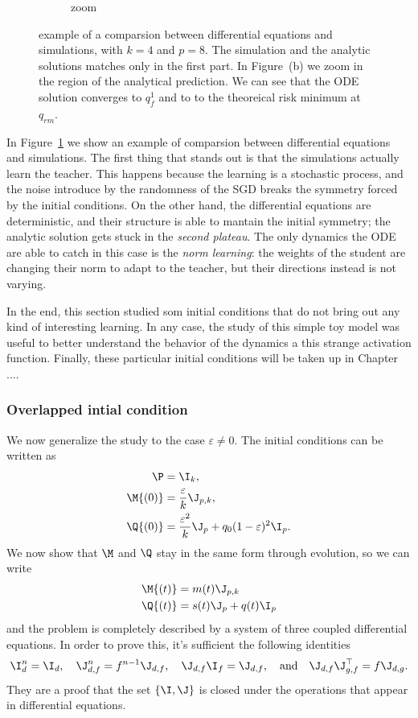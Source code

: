 \begin{figure}
\begin{subfigure}{0.45\textwidth}
    \caption{zoom}
  \end{subfigure}
  \caption{
    example of a comparsion between differential equations and simulations, with \(k=4\) and \(p=8\).
    The simulation and the analytic solutions matches only in the first part.
    In Figure~(b) we zoom in the region of the analytical prediction. We can see
    that the ODE solution converges to \(q_f^1\) and to to the theoreical risk minimum at \(q_{rm}\).
  }
  \label{fig:example-eps0}
\end{figure}
In Figure~\ref{fig:example-eps0} we show an example of comparsion between differential equations and simulations.
The first thing that stands out is that the simulations actually learn the teacher.
This happens because the learning is a stochastic process, and the noise introduce
by the randomness of the SGD breaks the symmetry forced by the initial conditions.
On the other hand, the differential equations are deterministic, and their structure
is able to mantain the initial symmetry; the analytic solution gets stuck in the 
\emph{second plateau}. The only dynamics the ODE are able to catch in this case is 
the \emph{norm learning}: the weights of the student are changing their norm to adapt 
to the teacher, but their directions instead is not varying.

In the end, this section studied som initial conditions that do not bring out any kind of interesting learning.
In any case, the study of this simple toy model was useful to better understand the behavior of the dynamics a this strange activation function.
Finally, these particular initial conditions will be taken up in Chapter ....

\subsubsection{Overlapped intial condition}
We now generalize the study to the case \(\varepsilon\neq0\).
The initial conditions can be written as
\[\begin{split}
    \P &= \I_k,\\
    \M{(0)} &= \frac{\varepsilon}{k}\J_{p,k},\\
    \Q{(0)} &= \frac{\varepsilon^2}{k}\J_{p} + q_0(1-\varepsilon)^2\I_{p}.\\
\end{split}\]
We now show that \(\M\) and \(\Q\) stay in the same form through evolution, so we can write
\[\begin{split}
    \M{(t)} &= m{(t)} \J_{p,k} \\
    \Q{(t)} &= s{(t)} \J_{p} + q{(t)}\I_{p} \\
\end{split}\]
and the problem is completely described by a system of three coupled differential equations.
In order to prove this, it's sufficient the following identities
\[
    \I_d^n=\I_d, \quad \J_{d,f}^n = f^{n-1}\J_{d,f}, \quad \J_{d,f}\I_f = \J_{d,f}, \quad\text{and}\quad
    \J_{d,f} \J_{g,f}^\top = f \J_{d,g}.
\]
They are a proof that the set \(\{\I,\J\}\) is closed under the operations that appear in differential equations.

